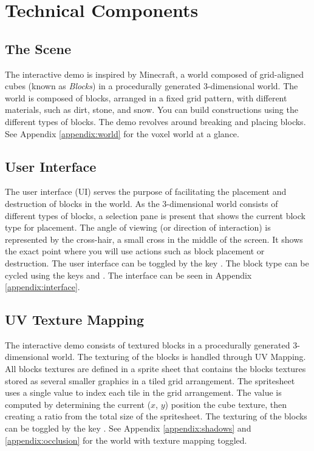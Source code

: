 \documentclass[a4paper,11pt,titlepage]{scrartcl}
\begin{document}
\section{Technical Components}
\subsection{The Scene}
\label{section:scene}
The interactive demo is inspired by Minecraft, a world composed of grid-aligned cubes (known as \textit{Blocks}) in a procedurally generated 3-dimensional world. The world is composed of blocks, arranged in a fixed grid pattern, with different materials, such as dirt, stone, and snow. You can build constructions using the different types of blocks. The demo revolves around breaking and placing blocks.
\vskip 2.5mm\noindent
See Appendix \ref{appendix:world} for the voxel world at a glance.
  
\subsection{User Interface}
\label{section:interface}
The user interface (UI) serves the purpose of facilitating the placement and destruction of blocks in the world. As the 3-dimensional world consists of different types of blocks, a selection pane is present that shows the current block type for placement. The angle of viewing (or direction of interaction) is represented by the cross-hair, a small cross in the middle of the screen. It shows the exact point where you will use actions such as block placement or destruction.
\vskip 2.5mm\noindent
The user interface can be toggled by the key . The block type can be cycled using the keys  and . The interface can be seen in Appendix \ref{appendix:interface}. 

\subsection{UV Texture Mapping}
\label{section:texture}
The interactive demo consists of textured blocks in a procedurally generated 3-dimensional world. The texturing of the blocks is handled through UV Mapping. All blocks textures are defined in a sprite sheet that contains the blocks textures stored as several smaller graphics in a tiled grid arrangement. The spritesheet uses a single value to index each tile in the grid arrangement. The value is computed by determining the current ($x$, $y$) position the cube texture, then creating a ratio from the total size of the spritesheet.
\vskip 2.5mm\noindent
The texturing of the blocks can be toggled by the key . See Appendix \ref{appendix:shadows} and \ref{appendix:occlusion} for the world with texture mapping toggled.
\end{document}

